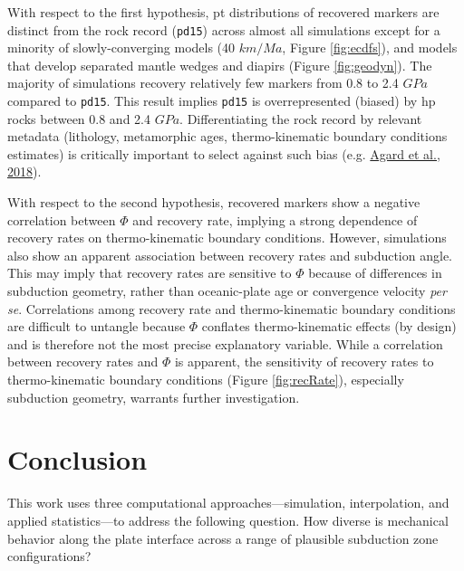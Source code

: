 With respect to the first hypothesis, \gls{pt} distributions of recovered markers are distinct from the rock record (\texttt{pd15}) across almost all simulations except for a minority of slowly-converging models (40 \(km/Ma\), Figure \ref{fig:ecdfs}), and models that develop separated mantle wedges and diapirs (Figure \ref{fig:geodyn}). The majority of simulations recovery relatively few markers from 0.8 to 2.4 \(GPa\) compared to \texttt{pd15}. This result implies \texttt{pd15} is overrepresented (biased) by \gls{hp} rocks between 0.8 and 2.4 \(GPa\). Differentiating the rock record by relevant metadata (lithology, metamorphic ages, thermo-kinematic boundary conditions estimates) is critically important to select against such bias (e.g. \protect\hyperlink{ref-agard2018}{Agard et al., 2018}).

With respect to the second hypothesis, recovered markers show a negative correlation between \(\Phi\) and recovery rate, implying a strong dependence of recovery rates on thermo-kinematic boundary conditions. However, simulations also show an apparent association between recovery rates and subduction angle. This may imply that recovery rates are sensitive to \(\Phi\) because of differences in subduction geometry, rather than oceanic-plate age or convergence velocity \emph{per se}. Correlations among recovery rate and thermo-kinematic boundary conditions are difficult to untangle because \(\Phi\) conflates thermo-kinematic effects (by design) and is therefore not the most precise explanatory variable. While a correlation between recovery rates and \(\Phi\) is apparent, the sensitivity of recovery rates to thermo-kinematic boundary conditions (Figure \ref{fig:recRate}), especially subduction geometry, warrants further investigation.

\cleardoublepage

\hypertarget{chpt5}{%
\chapter{Conclusion}\label{chpt5}}


This work uses three computational approaches---simulation, interpolation, and applied statistics---to address the following question. How diverse is mechanical behavior along the plate interface across a range of plausible subduction zone configurations?

